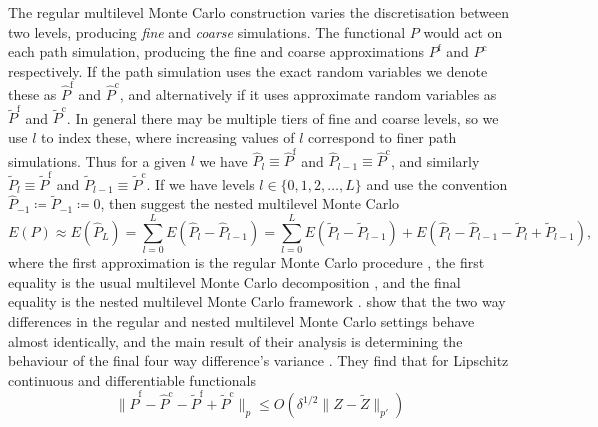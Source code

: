 \documentclass[manuscript,review]{acmart}
\begin{document}
The regular multilevel Monte Carlo construction varies the discretisation between two levels, producing \emph{fine} and \emph{coarse} simulations. The functional $ P $ would act on each path simulation, producing the fine and coarse approximations $ P^{\mathrm{f}} $ and $ P^{\mathrm{c}} $ respectively. If the path simulation uses the exact random variables we denote these as $ \widehat{P}^{\mathrm{f}} $ and $ \widehat{P}^{\mathrm{c}} $, and alternatively if it uses approximate random variables as $ \widetilde{P}^{\mathrm{f}} $ and $ \widetilde{P}^{\mathrm{c}} $. In general there may be multiple tiers of fine and coarse levels, so we use $ l $ to index these, where increasing values of $ l $ correspond to finer path simulations. Thus for a given $ l $ we have $ \widehat{P}_l \equiv \widehat{P}^{\mathrm{f}} $ and $ \widehat{P}_{l-1} \equiv \widehat{P}^{\mathrm{c}} $, and similarly $ \widetilde{P}_l \equiv \widetilde{P}^{\mathrm{f}} $ and $ \widetilde{P}_{l-1} \equiv \widetilde{P}^{\mathrm{c}} $. If we have levels $ l \in \{0, 1, 2, \ldots, L\} $ and use the convention $ \widehat{P}_{-1} \coloneqq \widetilde{P}_{-1} \coloneqq 0 $, then \citet{giles2020approximate} suggest the nested multilevel Monte Carlo
\begin{equation*}
E(P) 
\approx
E(\widehat{P}_L) 
= 
\sum_{l = 0}^{L} E(\widehat{P}_l - \widehat{P}_{l-1}) 
= 
\sum_{l = 0}^{L} E(\widetilde{P}_l - \widetilde{P}_{l-1}) +  E(\widehat{P}_l - \widehat{P}_{l-1} - \widetilde{P}_l + \widetilde{P}_{l-1}),
\end{equation*}
where the first approximation is the regular Monte Carlo procedure \citep{glasserman2013monte}, the first equality is the usual multilevel Monte Carlo decomposition \citep{giles2008multilevel}, and the final equality is the nested multilevel Monte Carlo framework \citep{giles2020approximate,sheridan2020nested}.
\citeauthor{giles2020approximate} \citep{giles2020approximate,sheridan2020nested} show that the two way differences in the regular and nested multilevel Monte Carlo settings behave almost identically, and the main result of their analysis is determining the behaviour of the final four way difference's variance \citep[lemmas~4.10 and 4.11]{giles2020approximate} \citep[corollaries~6.2.6.2 and 6.2.6.3]{sheridan2020nested}. They find that for Lipschitz continuous and differentiable functionals
\begin{equation*}
\lVert \widehat{P}^{\mathrm{f}} - \widehat{P}^{\mathrm{c}} - \widetilde{P}^{\mathrm{f}} + \widetilde{P}^{\mathrm{c}}\rVert_p 
\leq O(\delta^{1/2} \lVert Z - \widetilde{Z} \rVert_{p'}) 
\end{equation*}
\end{document}
